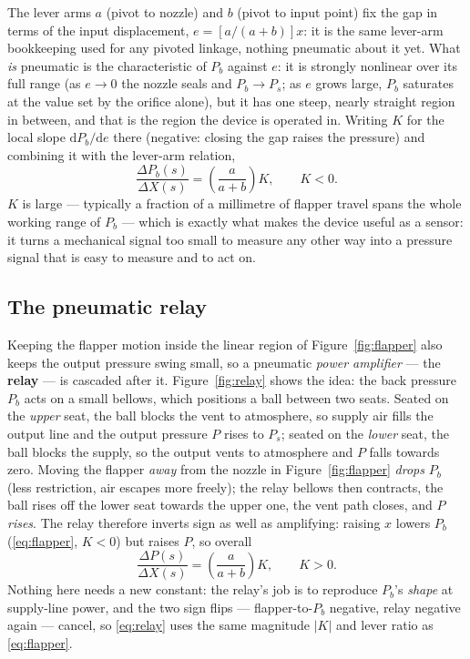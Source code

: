 \documentclass[11pt,a4paper]{article}
\begin{document}
The lever arms $a$ (pivot to nozzle) and $b$ (pivot to input point) fix the
gap in terms of the input displacement, $e=[a/(a+b)]x$: it is the same
lever-arm bookkeeping used for any pivoted linkage, nothing pneumatic about
it yet. What \emph{is} pneumatic is the characteristic of $P_{b}$ against
$e$: it is strongly nonlinear over its full range (as $e\to 0$ the nozzle
seals and $P_{b}\to P_{s}$; as $e$ grows large, $P_{b}$ saturates at the
value set by the orifice alone), but it has one steep, nearly straight region
in between, and that is the region the device is operated in. Writing $K$ for
the local slope $\mathrm{d}P_{b}/\mathrm{d}e$ there (negative: closing the gap
raises the pressure) and combining it with the lever-arm relation,
\begin{equation}
  \frac{\Delta P_{b}(s)}{\Delta X(s)}=\left(\frac{a}{a+b}\right)K,
  \qquad K<0.
  \label{eq:flapper}
\end{equation}
$K$ is large --- typically a fraction of a millimetre of flapper travel spans
the whole working range of $P_{b}$ --- which is exactly what makes the device
useful as a sensor: it turns a mechanical signal too small to measure any
other way into a pressure signal that is easy to measure and to act on.

\subsection{The pneumatic relay}
\label{sss:relaygain}

Keeping the flapper motion inside the linear region of
Figure~\ref{fig:flapper} also keeps the output pressure swing small, so a
pneumatic \emph{power amplifier} --- the \textbf{relay} --- is cascaded after
it. Figure~\ref{fig:relay} shows the idea: the back pressure $P_{b}$ acts on
a small bellows, which positions a ball between two seats. Seated on the
\emph{upper} seat, the ball blocks the vent to atmosphere, so supply air
fills the output line and the output pressure $P$ rises to $P_{s}$; seated on
the \emph{lower} seat, the ball blocks the supply, so the output vents to
atmosphere and $P$ falls towards zero. Moving the flapper \emph{away} from the
nozzle in Figure~\ref{fig:flapper} \emph{drops} $P_{b}$ (less restriction, air
escapes more freely); the relay bellows then contracts, the ball rises off
the lower seat towards the upper one, the vent path closes, and $P$
\emph{rises}. The relay therefore inverts sign as well as amplifying: raising
$x$ lowers $P_{b}$ (\eqref{eq:flapper}, $K<0$) but raises $P$, so overall
\begin{equation}
  \frac{\Delta P(s)}{\Delta X(s)}=\left(\frac{a}{a+b}\right)K, \qquad K>0.
  \label{eq:relay}
\end{equation}
Nothing here needs a new constant: the relay's job is to reproduce
$P_{b}$'s \emph{shape} at supply-line power, and the two sign flips ---
flapper-to-$P_b$ negative, relay negative again --- cancel, so \eqref{eq:relay}
uses the same magnitude $|K|$ and lever ratio as \eqref{eq:flapper}.
\end{document}
